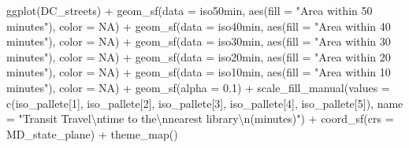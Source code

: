 \documentclass[
]{article}
\newenvironment{Shaded}{\begin{snugshade}}{\end{snugshade}}
\newcommand{\AttributeTok}[1]{\textcolor[rgb]{0.77,0.63,0.00}{#1}}
\newcommand{\ConstantTok}[1]{\textcolor[rgb]{0.00,0.00,0.00}{#1}}
\newcommand{\DecValTok}[1]{\textcolor[rgb]{0.00,0.00,0.81}{#1}}
\newcommand{\FloatTok}[1]{\textcolor[rgb]{0.00,0.00,0.81}{#1}}
\newcommand{\FunctionTok}[1]{\textcolor[rgb]{0.00,0.00,0.00}{#1}}
\newcommand{\NormalTok}[1]{#1}
\newcommand{\SpecialCharTok}[1]{\textcolor[rgb]{0.00,0.00,0.00}{#1}}
\newcommand{\StringTok}[1]{\textcolor[rgb]{0.31,0.60,0.02}{#1}}
\begin{document}
\begin{Shaded}
\begin{Highlighting}[]
\FunctionTok{ggplot}\NormalTok{(DC\_streets) }\SpecialCharTok{+}
  \FunctionTok{geom\_sf}\NormalTok{(}\AttributeTok{data =}\NormalTok{ iso50min, }
          \FunctionTok{aes}\NormalTok{(}\AttributeTok{fill =} \StringTok{"Area within 50 minutes"}\NormalTok{), }
          \AttributeTok{color =} \ConstantTok{NA}\NormalTok{) }\SpecialCharTok{+}  
  \FunctionTok{geom\_sf}\NormalTok{(}\AttributeTok{data =}\NormalTok{ iso40min, }
          \FunctionTok{aes}\NormalTok{(}\AttributeTok{fill =} \StringTok{"Area within 40 minutes"}\NormalTok{), }
          \AttributeTok{color =} \ConstantTok{NA}\NormalTok{) }\SpecialCharTok{+}
  \FunctionTok{geom\_sf}\NormalTok{(}\AttributeTok{data =}\NormalTok{ iso30min, }
          \FunctionTok{aes}\NormalTok{(}\AttributeTok{fill =} \StringTok{"Area within 30 minutes"}\NormalTok{), }
          \AttributeTok{color =} \ConstantTok{NA}\NormalTok{) }\SpecialCharTok{+}
  \FunctionTok{geom\_sf}\NormalTok{(}\AttributeTok{data =}\NormalTok{ iso20min, }
          \FunctionTok{aes}\NormalTok{(}\AttributeTok{fill =} \StringTok{"Area within 20 minutes"}\NormalTok{), }
          \AttributeTok{color =} \ConstantTok{NA}\NormalTok{) }\SpecialCharTok{+}
  \FunctionTok{geom\_sf}\NormalTok{(}\AttributeTok{data =}\NormalTok{ iso10min, }
          \FunctionTok{aes}\NormalTok{(}\AttributeTok{fill =} \StringTok{"Area within 10 minutes"}\NormalTok{), }
          \AttributeTok{color =} \ConstantTok{NA}\NormalTok{) }\SpecialCharTok{+}
  \FunctionTok{geom\_sf}\NormalTok{(}\AttributeTok{alpha =} \FloatTok{0.1}\NormalTok{) }\SpecialCharTok{+}
  \FunctionTok{scale\_fill\_manual}\NormalTok{(}\AttributeTok{values =} \FunctionTok{c}\NormalTok{(iso\_pallete[}\DecValTok{1}\NormalTok{],}
\NormalTok{                               iso\_pallete[}\DecValTok{2}\NormalTok{],}
\NormalTok{                               iso\_pallete[}\DecValTok{3}\NormalTok{],}
\NormalTok{                               iso\_pallete[}\DecValTok{4}\NormalTok{],}
\NormalTok{                               iso\_pallete[}\DecValTok{5}\NormalTok{]),}
        \AttributeTok{name =} \StringTok{"Transit Travel}\SpecialCharTok{\textbackslash{}n}\StringTok{time to the}\SpecialCharTok{\textbackslash{}n}\StringTok{nearest library}\SpecialCharTok{\textbackslash{}n}\StringTok{(minutes)"}\NormalTok{) }\SpecialCharTok{+}
  \FunctionTok{coord\_sf}\NormalTok{(}\AttributeTok{crs =}\NormalTok{ MD\_state\_plane) }\SpecialCharTok{+}
  \FunctionTok{theme\_map}\NormalTok{()}
\end{Highlighting}
\end{Shaded}
\end{document}
